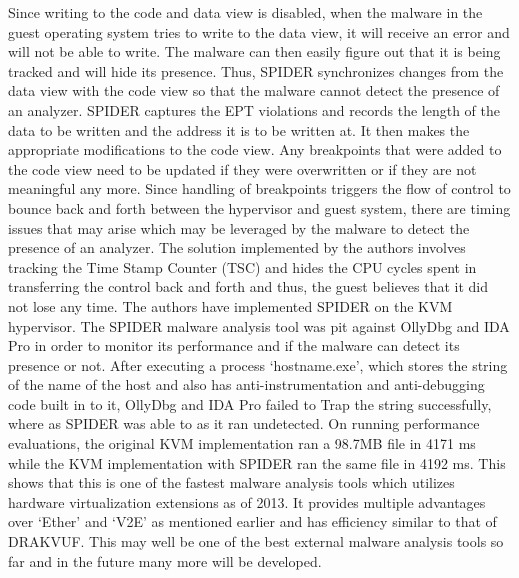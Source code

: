 \documentclass[11pt]{article}
\begin{document}
	Since writing to the code and data view is disabled, when the malware in the guest operating system tries to write to the data view, it will receive an error and will not be able to write. The malware can then easily figure out that it is being tracked and will hide its presence. Thus, SPIDER synchronizes changes from the data view with the code view so that the malware cannot detect the presence of an analyzer. SPIDER captures the EPT violations and records the length of the data to be written and the address it is to be written at. It then makes the appropriate modifications to the code view. Any breakpoints that were added to the code view need to be updated if they were overwritten or if they are not meaningful any more. Since handling of breakpoints triggers the flow of control to bounce back and forth between the hypervisor and guest system, there are timing issues that may arise which may be leveraged by the malware to detect the presence of an analyzer. The solution implemented by the authors involves tracking the Time Stamp Counter (TSC) and hides the CPU cycles spent in transferring the control back and forth and thus, the guest believes that it did not lose any time. The authors have implemented SPIDER on the KVM hypervisor.
	The SPIDER malware analysis tool was pit against OllyDbg and IDA Pro in order to monitor its performance and if the malware can detect its presence or not. After executing a process ‘hostname.exe’, which stores the string of the name of the host and also has anti-instrumentation and anti-debugging code built in to it, OllyDbg and IDA Pro failed to Trap the string successfully, where as SPIDER was able to as it ran undetected. On running performance evaluations, the original KVM implementation ran a 98.7MB file in 4171 ms while the KVM implementation with SPIDER ran the same file in 4192 ms. This shows that this is one of the fastest malware analysis tools which utilizes hardware virtualization extensions as of 2013. It provides multiple advantages over ‘Ether’ and ‘V2E’ as mentioned earlier and has efficiency similar to that of DRAKVUF. This may well be one of the best external malware analysis tools so far and in the future many more will be developed. \\ \\
\end{document}
